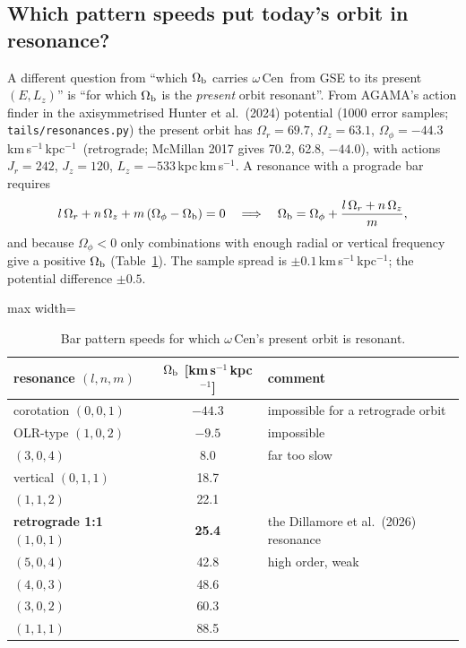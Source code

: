\documentclass[11pt,a4paper]{article}
\newcommand{\kms}{km\,s$^{-1}$}
\newcommand{\kmskpc}{km\,s$^{-1}$\,kpc$^{-1}$}
\newcommand{\ocen}{$\omega$\,Cen}
\newcommand{\Lz}{L_z}
\newcommand{\Ob}{\Omega_{\rm b}}
\begin{document}
\subsection{Which pattern speeds put today's orbit in resonance?}
\label{sec:resonances}
A different question from ``which $\Ob$ carries \ocen\ from GSE to its present $(E,\Lz)$'' is
``for which $\Ob$ is the \emph{present} orbit resonant''. From AGAMA's action finder in the
axisymmetrised Hunter et al.\ (2024) potential (1000 error samples;
\texttt{tails/resonances.py}) the present orbit has
$\Omega_r=69.7$, $\Omega_z=63.1$, $\Omega_\phi=-44.3$\,\kmskpc\ (retrograde; McMillan 2017
gives 70.2, 62.8, $-44.0$), with actions $J_r=242$, $J_z=120$, $\Lz=-533$\,kpc\,\kms. A
resonance with a prograde bar requires
\begin{equation}
l\,\Omega_r + n\,\Omega_z + m\,(\Omega_\phi-\Ob)=0
\quad\Longrightarrow\quad
\Ob=\Omega_\phi+\frac{l\,\Omega_r+n\,\Omega_z}{m},
\end{equation}
and because $\Omega_\phi<0$ only combinations with enough radial or vertical frequency give a
positive $\Ob$ (Table~\ref{tab:res}). The sample spread is $\pm0.1$\,\kmskpc; the potential
difference $\pm0.5$.

\begin{table}[h]\centering
\caption{Bar pattern speeds for which \ocen's present orbit is resonant.}
\label{tab:res}
\begin{adjustbox}{max width=\linewidth}
\begin{tabular}{lcl}\toprule
resonance $(l,n,m)$ & $\Ob$ [\kmskpc] & comment\\\midrule
corotation $(0,0,1)$ & $-44.3$ & impossible for a retrograde orbit\\
OLR-type $(1,0,2)$ & $-9.5$ & impossible\\
$(3,0,4)$ & 8.0 & far too slow\\
vertical $(0,1,1)$ & 18.7 & \\
$(1,1,2)$ & 22.1 & \\
\textbf{retrograde 1:1} $(1,0,1)$ & \textbf{25.4} & the Dillamore et al.\ (2026) resonance\\
$(5,0,4)$ & 42.8 & high order, weak\\
$(4,0,3)$ & 48.6 & \\
$(3,0,2)$ & 60.3 & \\
$(1,1,1)$ & 88.5 & \\
\bottomrule\end{tabular}
\end{adjustbox}
\end{table}
\end{document}
